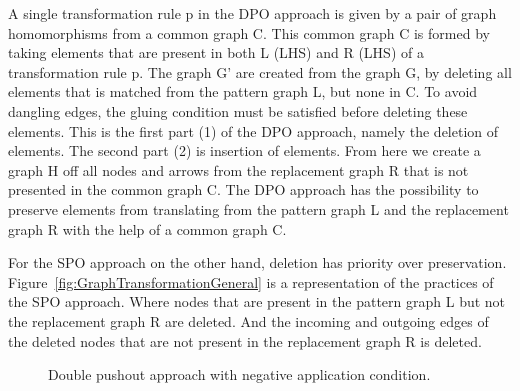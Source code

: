 A single transformation rule p in the DPO approach is given by a pair of graph
homomorphisms from a common graph C. This common graph C is formed by taking
elements that are present in both L (LHS) and R (LHS) of a transformation rule
p. The graph G' are created from the graph G, by deleting all elements that is
matched from the pattern graph L, but none in C. To avoid dangling edges,
the gluing condition must be satisfied before deleting these elements. This is
the first part (1) of the DPO approach, namely the deletion of elements. The
second part (2) is insertion of elements. From here we create a graph H off all
nodes and arrows from the replacement graph R that is not presented in the
common graph C. The DPO approach has the possibility to preserve elements from
translating from the pattern graph L and the replacement graph R with the help
of a common graph C.

For the SPO approach on the other hand, deletion has priority over preservation.
Figure~\ref{fig:GraphTransformationGeneral} is a representation of the practices
of the SPO approach. Where nodes that are present in the pattern graph L but not
the replacement graph R are deleted. And the incoming and outgoing edges of the
deleted nodes that are not present in the replacement graph R is deleted.



\cite{habel1996graph}

\begin{figure}[H]
	\centering
	\caption[The Double Pushout approach with NAC]
	{Double pushout approach with negative application condition.}
	\label{fig:DPO_NAC}
\end{figure}

